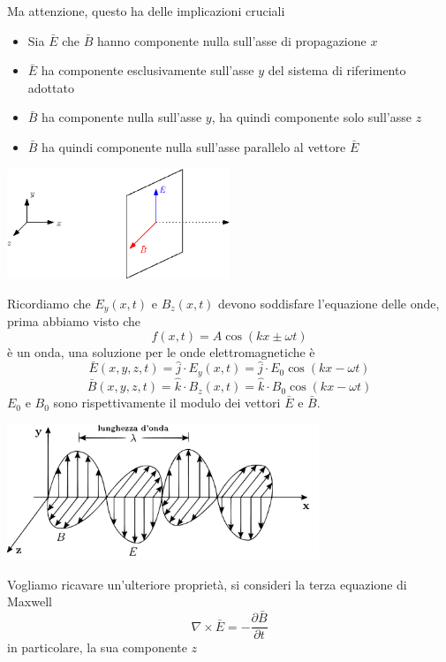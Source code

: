 \documentclass[10pt, letterpaper]{report}
\begin{document}
Ma attenzione, questo ha delle implicazioni cruciali\begin{itemize}
    \item Sia $\bar E$ che $\bar B$ hanno componente nulla sull'asse di propagazione $x$
    \item $\bar E$ ha componente esclusivamente sull'asse $y$ del sistema di riferimento adottato 
    \item $\bar B$ ha componente nulla sull'asse $y$, ha quindi componente solo sull'asse $z$
    \item $\bar B$ ha quindi componente nulla sull'asse parallelo al vettore $\bar E$
\end{itemize}
\begin{center}
    \includegraphics[width=0.5\textwidth]{images/EM1}
\end{center}
Ricordiamo che $E_y(x,t)$ e $B_z(x,t)$ devono soddisfare l'equazione delle onde, prima abbiamo visto che $$ f(x,t)=
A\cos(kx\pm\omega t)
$$
è un onda, una soluzione per le onde elettromagnetiche è 
$$ 
\bar E(x,y,z,t) = \hat j \cdot E_y(x,t)=\hat j\cdot E_0\cos(kx-\omega t)
$$
$$ 
\bar B(x,y,z,t) = \hat k\cdot B_z(x,t)=\hat k \cdot B_0\cos(kx-\omega t)
$$
$E_0$ e $B_0$ sono rispettivamente il modulo dei vettori $\bar E$ e $\bar B$.\begin{center}
    \includegraphics[width=0.7\textwidth]{images/EM.pdf}
\end{center}
Vogliamo ricavare un'ulteriore proprietà, si consideri la terza equazione di Maxwell$$\nabla \times \bar E = -\dfrac{\partial \bar B }{\partial t}$$ in particolare, la sua componente $z$
\end{document}
